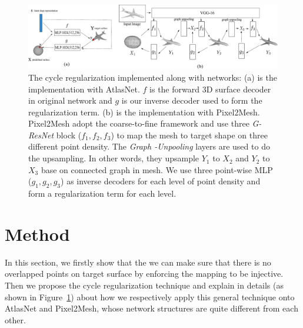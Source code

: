 \begin{figure}[htbp]
	\centering
	\includegraphics[width=\linewidth]{img/net/net}
	\caption{The cycle regularization implemented along with networks: (a) is the implementation with AtlasNet\cite{atlasnet}. $f$ is the forward 3D surface decoder in original network and $g$ is our inverse decoder used to form the regularization term. (b) is the implementation with Pixel2Mesh\cite{pixel2mesh}.  Pixel2Mesh\cite{pixel2mesh} adopt the coarse-to-fine framework and use three \emph{G-ResNet} block ($f_1,f_2,f_3$) to map the mesh to target shape on three different point density. The \emph{Graph -Unpooling} layers are used to do the upsampling. In other words, they upsample $Y_1$ to $X_2$ and $Y_2$ to $X_3$ base on connected graph in mesh. We use three point-wise MLP ($g_1,g_2,g_3$) as inverse decoders for each level of point density and form a regularization term for each level.}
	\label{fig:net}
\end{figure}
\section{Method}
In this section, we firstly show that the we can make sure that there is no overlapped points on target surface by enforcing the mapping to be injective. 
Then we propose the cycle regularization technique and explain in details (as shown in Figure~\ref{fig:net}) about how we respectively apply this general technique onto AtlasNet\cite{atlasnet} and Pixel2Mesh\cite{pixel2mesh}, whose network structures are quite different from each other. 
